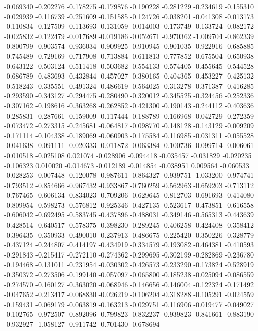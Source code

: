 -0.069340
-0.202276
-0.178275
-0.179876
-0.190228
-0.281229
-0.234619
-0.155310
-0.029939
-0.116739
-0.251609
-0.151585
-0.124726
-0.038201
-0.041308
-0.013173
-0.110834
-0.127509
-0.113693
-0.131059
-0.014003
-0.173749
-0.133724
-0.082172
-0.025832
-0.122479
-0.017689
-0.019186
-0.052671
-0.970362
-1.009704
-0.862339
-0.800799
-0.903574
-0.936034
-0.909925
-0.910945
-0.901035
-0.922916
-0.685885
-0.745489
-0.729169
-0.717908
-0.713884
-0.611813
-0.777852
-0.675504
-0.650938
-0.643122
-0.503124
-0.511418
-0.503682
-0.554133
-0.574405
-0.455645
-0.544528
-0.686789
-0.483693
-0.432844
-0.457027
-0.380165
-0.404365
-0.453227
-0.425132
-0.518243
-0.335551
-0.491324
-0.486619
-0.564025
-0.313278
-0.371387
-0.416285
-0.293590
-0.343127
-0.294475
-0.280490
-0.320012
-0.345525
-0.324456
-0.252336
-0.307162
-0.198616
-0.363268
-0.262852
-0.421300
-0.190143
-0.244112
-0.403636
-0.285831
-0.287661
-0.159009
-0.117444
-0.188789
-0.166968
-0.042729
-0.272359
-0.073472
-0.273315
-0.245681
-0.064817
-0.098770
-0.148128
-0.143129
-0.009209
-0.171114
-0.104338
-0.189069
-0.060903
-0.175584
-0.116985
-0.031311
-0.055528
-0.041638
-0.091111
-0.020333
-0.011872
-0.063384
-0.100736
-0.099714
-0.006061
-0.010518
-0.025108
0.021074
-0.028906
-0.094418
-0.035457
-0.031829
-0.020235
-0.106323
0.010020
-0.014673
-0.012189
-0.014854
-0.038951
0.009564
-0.060533
-0.028253
-0.007448
-0.120078
-0.987611
-0.864327
-0.939751
-1.033200
-0.974741
-0.793512
-0.854666
-0.967432
-0.933867
-0.760259
-0.562963
-0.659203
-0.713112
-0.767465
-0.606134
-0.834023
-0.709206
-0.629645
-0.812703
-0.691693
-0.414080
-0.809954
-0.598273
-0.576812
-0.925346
-0.427135
-0.523617
-0.473851
-0.616558
-0.606042
-0.692495
-0.583745
-0.437896
-0.488031
-0.349146
-0.565313
-0.443639
-0.428514
-0.640517
-0.578375
-0.398230
-0.289245
-0.406258
-0.424408
-0.358412
-0.396435
-0.350933
-0.490010
-0.237913
-0.486675
-0.225420
-0.350226
-0.328779
-0.437124
-0.244807
-0.414197
-0.434919
-0.334579
-0.193082
-0.464381
-0.410593
-0.291843
-0.215417
-0.272110
-0.274362
-0.299695
-0.302199
-0.282869
-0.236780
-0.194468
-0.131011
-0.231954
-0.030302
-0.426573
-0.233290
-0.173824
-0.528919
-0.350372
-0.273506
-0.199140
-0.057097
-0.065800
-0.185238
-0.025094
-0.086559
-0.274570
-0.160127
-0.363020
-0.068946
-0.146656
-0.146004
-0.122324
-0.171492
-0.047652
-0.213417
-0.068830
-0.026219
-0.106204
-0.318288
-0.105291
-0.024559
-0.159431
-0.069179
-0.063819
-0.163213
-0.029751
-0.116906
-0.019477
-0.049027
-0.102765
-0.972507
-0.892096
-0.799823
-0.832237
-0.939823
-0.841661
-0.883190
-0.932927
-1.058127
-0.911742
-0.701430
-0.678694
